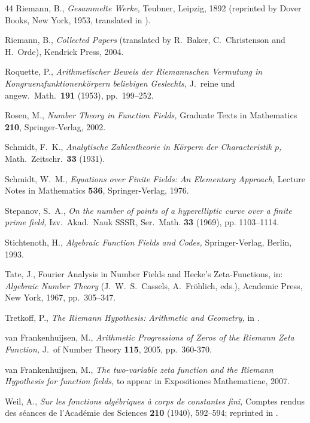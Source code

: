 \documentclass{amsart}
\theoremstyle{definition}\newtheorem{definition}[theorem]{Definition}
\theoremstyle{remark}\newtheorem{remark}[theorem]{Remark}
\numberwithin{equation}{section}
\begin{document}
\begin{thebibliography}{44}
	Riemann, B.,
{\em Gesammelte Werke,\/}
Teubner, Leipzig, 1892 (reprinted by Dover Books, New York, 1953, translated in \cite{RiemannT}).

	Riemann, B.,
{\em Collected Papers\/}
(translated by R.\ Baker, C.\ Christenson and H.\ Orde), Kendrick Press, 2004.

	Roquette, P.,
{\em Arithmetischer Beweis der Riemannschen Vermutung in Kongruenzfunktionenk\"orpern beliebigen Geslechts,\/}
J.\ reine und angew.\ Math.\ \textbf{191} (1953), pp.~199--252.

	Rosen, M.,
{\em Number Theory in Function Fields,\/} Graduate Texts in Mathematics \textbf{210}, Springer-Verlag, 2002.

	Schmidt, F.~K.,
{\em Analytische Zahlentheorie in K\"orpern der Characteristik $p$,\/}
Math.\ Zeitschr.\ \textbf{33} (1931).

	Schmidt, W.~M.,
{\em Equations over Finite Fields: An Elementary Approach,\/}
Lecture Notes in Mathematics \textbf{536}, Springer-Verlag, 1976.

	Stepanov, S.\ A.,
{\em On the number of points of a hyperelliptic curve over a finite prime field,\/}
Izv.\ Akad.\ Nauk SSSR, Ser.\ Math. \textbf{33} (1969), pp. 1103--1114.

	Stichtenoth, H.,
{\em Algebraic Function Fields and Codes,\/} Springer-Verlag, Berlin, 1993.

	Tate, J.,
Fourier Analysis in Number Fields and Hecke's Zeta-Functions,
in: \textit{Algebraic Number Theory} (J.\ W.\ S.~Cassels, A.~Fr\"ohlich, eds.), Academic Press, New York, 1967, pp.~305--347.

	Tretkoff, P.,
\textit{The Riemann Hypothesis: Arithmetic and Geometry,\/}
in \cite[pp.~143--189]{Roe}.

	van Frankenhuijsen, M.,
{\em Arithmetic Progressions of Zeros of the Riemann Zeta Function,\/}
J.\ of Number Theory \textbf{115}, 2005, pp.~360-370.

	van Frankenhuijsen, M.,
\textit{The two-variable zeta function and the Riemann Hypothesis for function fields,}
to appear in Expositiones Mathematicae, 2007.

	Weil, A.,
\textit{Sur les fonctions alg\'ebriques \`a corps de constantes fini,}
{Comptes rendus des s\'eances de l'Acad\'emie des Sciences} \textbf{210} (1940), 592--594; reprinted in \cite[vol.~I, pp.~257--259]{aW80}.


\end{thebibliography}
\end{document}
